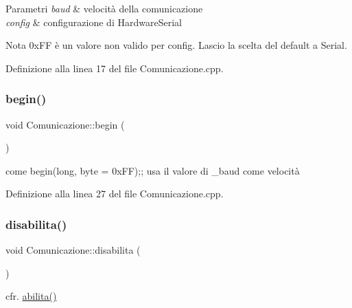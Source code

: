 \begin{DoxyParams}{Parametri}
{\em baud} & velocità della comunicazione \\
\hline
{\em config} & configurazione di {\ttfamily Hardware\+Serial} \\
\hline
\end{DoxyParams}
\begin{DoxyNote}{Nota}
0x\+FF è un valore non valido per {\ttfamily config}. Lascio la scelta del default a Serial. 
\end{DoxyNote}


Definizione alla linea 17 del file Comunicazione.\+cpp.

\mbox{\label{class_comunicazione_a186ab1065f1bdc50f59c19d401634d2f}} 
\subsubsection{\texorpdfstring{begin()}{begin()}\hspace{0.1cm}{\footnotesize\ttfamily [2/2]}}
{\footnotesize\ttfamily void Comunicazione\+::begin (\begin{DoxyParamCaption}{ }\end{DoxyParamCaption})}



come {\ttfamily begin(long, byte = 0x\+FF);}; usa il valore di {\ttfamily \+\_\+baud} come velocità 



Definizione alla linea 27 del file Comunicazione.\+cpp.

\mbox{\label{class_comunicazione_a5758b730adbaec6af47d44373d8dce3b}} 
\subsubsection{\texorpdfstring{disabilita()}{disabilita()}}
{\footnotesize\ttfamily void Comunicazione\+::disabilita (\begin{DoxyParamCaption}{ }\end{DoxyParamCaption})}



cfr. {\ttfamily \hyperlink{class_comunicazione_a08e76063956fc38d54002d8f17786cb6}{abilita()}} 



